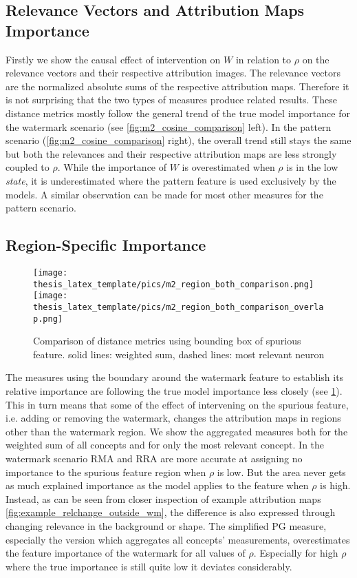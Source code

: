 \subsection{Relevance Vectors and Attribution Maps Importance}
Firstly we show the causal effect of intervention on $W$ in relation to $\rho$ on the relevance vectors and their respective attribution images. 
The relevance vectors are the normalized absolute sums of the respective attribution maps. Therefore it is not surprising that the two types of measures produce related results.
These distance metrics mostly follow the general trend of the true model importance for the watermark scenario (see \cref{fig:m2_cosine_comparison} left). In the pattern scenario (\cref{fig:m2_cosine_comparison} right), the overall trend still stays the same but both the relevances and their respective attribution maps are less strongly coupled to $\rho$. While the importance of $W$ is overestimated when $\rho$ is in the low \textit{state}, it is underestimated where the pattern feature is used exclusively by the models. A similar observation can be made for most other measures for the pattern scenario. 


\subsection{Region-Specific Importance}

\begin{figure}[ht!]
\centering
    \texttt{[image: thesis\_latex\_template/pics/m2\_region\_both\_comparison.png]}
    \texttt{[image: thesis\_latex\_template/pics/m2\_region\_both\_comparison\_overlap.png]}
    \caption[Region Specific, Comparison of Metrics]{Comparison of distance metrics using bounding box of spurious feature. solid lines: weighted sum, dashed lines: most relevant neuron}
    \label{fig:m2_region_comparison}
\end{figure}

The measures using the boundary around the watermark feature to establish its relative importance are following the true model importance less closely (see \cref{fig:m2_region_comparison}). 
This in turn means that some of the effect of intervening on the spurious feature, i.e. adding or removing the watermark, changes the attribution maps in regions other than the watermark region. We show the aggregated measures both for the weighted sum of all concepts and for only the most relevant concept. 
In the watermark scenario RMA and RRA are more accurate at assigning no importance to the spurious feature region when $\rho$ is low. But the area never gets as much explained importance as the model applies to the feature when $\rho$ is high. Instead, as can be seen from closer inspection of example attribution maps \cref{fig:example_relchange_outside_wm}, the difference is also expressed through changing relevance in the background or shape. 
The simplified PG measure, especially the version which aggregates all concepts' measurements, overestimates the feature importance of the watermark for all values of $\rho$. Especially for high $\rho$ where the true importance is still quite low it deviates considerably.

